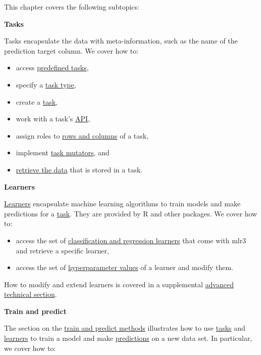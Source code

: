 \documentclass[]{article}
\providecommand{\tightlist}{%
  \setlength{\itemsep}{0pt}\setlength{\parskip}{0pt}}
\begin{document}
This chapter covers the following subtopics:

\textbf{Tasks}

Tasks encapsulate the data with meta-information, such as the name of the prediction target column.
We cover how to:

\begin{itemize}
\tightlist
\item
  access \protect\hyperlink{tasks-predefined}{predefined tasks},
\item
  specify a \protect\hyperlink{tasks-types}{task type},
\item
  create a \protect\hyperlink{tasks-creation}{task},
\item
  work with a task's \protect\hyperlink{tasks-api}{API},
\item
  assign roles to \protect\hyperlink{tasks-roles}{rows and columns} of a task,
\item
  implement \protect\hyperlink{tasks-mutators}{task mutators}, and
\item
  \protect\hyperlink{tasks-retrieved}{retrieve the data} that is stored in a task.
\end{itemize}

\textbf{Learners}

\protect\hyperlink{learners}{Learners} encapsulate machine learning algorithms to train models and make predictions for a \protect\hyperlink{tasks}{task}.
They are provided by R and other packages.
We cover how to:

\begin{itemize}
\tightlist
\item
  access the set of \protect\hyperlink{learners-predefined}{classification and regression learners} that come with mlr3 and retrieve a specific learner,
\item
  access the set of \protect\hyperlink{learners-predefined}{hyperparameter values} of a learner and modify them.
\end{itemize}

How to modify and extend learners is covered in a supplemental \protect\hyperlink{extending-learners}{advanced technical section}.

\textbf{Train and predict}

The section on the \protect\hyperlink{train-predict}{train and predict methods} illustrates how to use \protect\hyperlink{tasks}{tasks} and \protect\hyperlink{learners}{learners} to train a model and make \protect\hyperlink{predicting}{predictions} on a new data set.
In particular, we cover how to:
\end{document}
